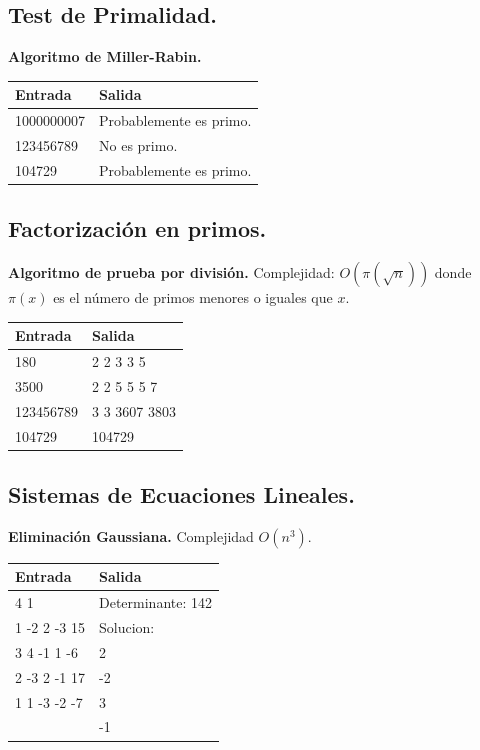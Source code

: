 \documentclass[11pt, letterpaper, twoside]{article}
\begin{document}
\subsection{Test de Primalidad.}

\textbf{Algoritmo de Miller-Rabin.}

 

\begin{tabular}{|p{7cm}|p{7cm}|}
\hline
\textbf{Entrada} & \textbf{Salida}\\ \hline
1000000007 & Probablemente es primo.\\
123456789  & No es primo.\\
104729     & Probablemente es primo.\\ \hline
\end{tabular}\bigskip

\subsection{Factorización en primos.}

\textbf{Algoritmo de prueba por división.} Complejidad: $O\left(\pi\left(\sqrt{n}\right)\right)$ donde $\pi(x)$ es el número de primos menores o iguales que $x$.



\begin{tabular}{|p{7cm}|p{7cm}|}
\hline
\textbf{Entrada} & \textbf{Salida}\\ \hline
180       & 2 2 3 3 5\\
3500      & 2 2 5 5 5 7\\ 
123456789 & 3 3 3607 3803\\
104729    & 104729\\ \hline
\end{tabular}\bigskip

\subsection{Sistemas de Ecuaciones Lineales.}

\textbf{Eliminación Gaussiana.} Complejidad $O(n^3)$.



\begin{tabular}{|p{7cm}|p{7cm}|}
\hline
\textbf{Entrada} & \textbf{Salida}\\ \hline
4 1          & Determinante: 142\\
1 -2 2 -3 15 & Solucion:\\ 
3 4 -1 1 -6  & 2\\ 
2 -3 2 -1 17 & -2\\ 
1 1 -3 -2 -7 & 3\\ 
             & -1\\ \hline
\end{tabular}\bigskip
\end{document}
